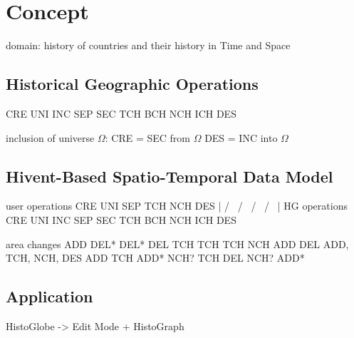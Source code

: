 
\section{Concept} %
\label{sec:concept}

domain: history of countries and their history in Time and Space


\subsection{Historical Geographic Operations} %
\label{sub:historical_geographic_operations}

CRE
UNI
INC
SEP
SEC
TCH
BCH
NCH
ICH
DES



inclusion of universe $\Omega$:
CRE = SEC from $\Omega$
DES = INC into $\Omega$



\subsection{Hivent-Based Spatio-Temporal Data Model} %
\label{sub:hivent_based_spatio_temporal_data_model}

user operations     CRE     UNI          SEP         TCH         NCH      DES
                     |      / \         /   \        /  \       /   \      |
HG operations       CRE   UNI   INC   SEP   SEC   TCH   BCH   NCH   ICH   DES

area changes        ADD   DEL*  DEL*  DEL   TCH   TCH   TCH   NCH   ADD   DEL
ADD, TCH, NCH, DES        ADD   TCH   ADD*  NCH?        TCH         DEL
                                NCH?        ADD*







\subsection{Application} %
\label{sub:application}

HistoGlobe -> Edit Mode + HistoGraph






